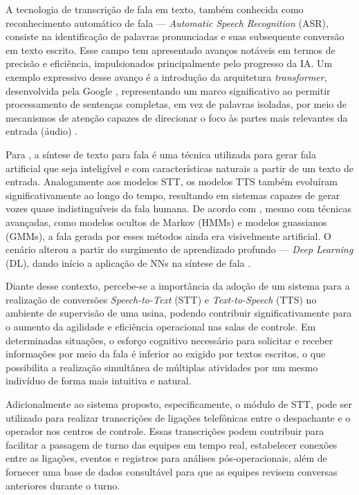 \documentclass[
	12pt,				%
	a4paper,			%
	english,			%
	brazil,				%
	]{article}
\begin{document}
A tecnologia de transcrição de fala em texto, também conhecida como reconhecimento automático de fala — \textit{Automatic Speech Recognition} (ASR), consiste na identificação de palavras pronunciadas e suas subsequente conversão em texto escrito. Esse campo tem apresentado avanços notáveis em termos de precisão e eficiência, impulsionados principalmente pelo progresso da IA. Um exemplo expressivo desse avanço é a introdução da arquitetura \textit{transformer}, desenvolvida pela Google \cite{vaswani2017}, representando um marco significativo ao permitir processamento de sentenças completas, em vez de palavras isoladas, por meio de mecanismos de atenção capazes de direcionar o foco às partes mais relevantes da entrada (áudio) \cite{utkarsh2024}.

Para , a síntese de texto para fala é uma técnica utilizada para gerar fala artificial que seja inteligível e com características naturais a partir de um texto de entrada. Analogamente aos modelos STT, os modelos TTS também evoluíram significativamente ao longo do tempo, resultando em sistemas capazes de gerar vozes quase indistinguíveis da fala humana. De acordo com , mesmo com técnicas avançadas, como modelos ocultos de Markov (HMMs) e modelos guassianos (GMMs), a fala gerada por esses métodos ainda era visivelmente artificial. O cenário alterou a partir do surgimento de aprendizado profundo — \textit{Deep Learning} (DL), dando início a aplicação de NNs na síntese de fala \cite{barakat2024}.

Diante desse contexto, percebe-se a importância da adoção de um sistema para a realização de conversões \textit{Speech-to-Text} (STT) e \textit{Text-to-Speech} (TTS) no ambiente de supervisão de uma usina, podendo contribuir significativamente para o aumento da agilidade e eficiência operacional nas salas de controle. Em determinadas situações, o esforço cognitivo necessário para solicitar e receber informações por meio da fala é inferior ao exigido por textos escritos, o que possibilita a realização simultânea de múltiplas atividades por um mesmo indivíduo de forma mais intuitiva e natural.

Adicionalmente ao sistema proposto, especificamente, o módulo de STT, pode ser utilizado para realizar transcrições de ligações telefônicas entre o despachante e o operador nos centros de controle. Essas transcrições podem contribuir para facilitar a passagem de turno das equipes em tempo real, estabelecer conexões entre as ligações, eventos e registros para análises pós-operacionais, além de fornecer uma base de dados consultável para que as equipes revisem conversas anteriores durante o turno. 
\end{document}
